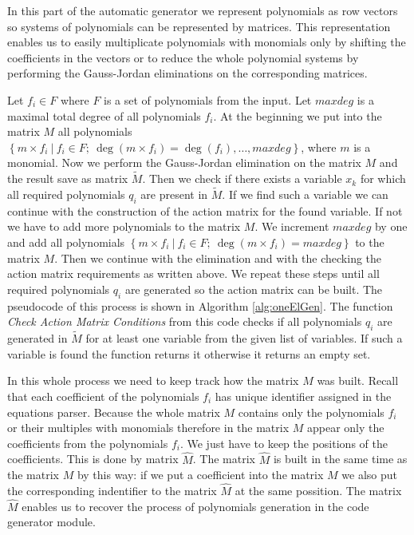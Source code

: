 In this part of the automatic generator we represent polynomials as row vectors so systems of polynomials can be represented by matrices. This representation enables us to easily multiplicate polynomials with monomials only by shifting the coefficients in the vectors or to reduce the whole polynomial systems by performing the Gauss-Jordan eliminations on the corresponding matrices.

Let $f_i \in F$ where $F$ is a set of polynomials from the input. Let $maxdeg$ is a maximal total degree of all polynomials $f_i$. At the beginning we put into the matrix $M$ all polynomials $\left\{m\times f_i\ |\ f_i \in F;\ \deg(m\times f_i) = \deg(f_i),\dots, maxdeg\right\}$, where $m$ is a monomial. Now we perform the Gauss-Jordan elimination on the matrix $M$ and the result save as matrix $\tilde{M}$. Then we check if there exists a variable $x_k$ for which all required polynomials $q_i$ are present in $\tilde{M}$. If we find such a variable we can continue with the construction of the action matrix for the found variable. If not we have to add more polynomials to the matrix $M$. We increment $maxdeg$ by one and add all polynomials $\left\{m\times f_i\ |\ f_i \in F;\ \deg(m\times f_i) = maxdeg\right\}$ to the matrix $M$. Then we continue with the elimination and with the checking the action matrix requirements as written above. We repeat these steps until all required polynomials $q_i$ are generated so the action matrix can be built. The pseudocode of this process is shown in Algorithm \ref{alg:oneElGen}. The function \textit{Check Action Matrix Conditions} from this code checks if all polynomials $q_i$ are generated in $\tilde{M}$ for at least one variable from the given list of variables. If such a variable is found the function returns it otherwise it returns an empty set.



In this whole process we need to keep track how the matrix $M$ was built. Recall that each coefficient of the polynomials $f_i$ has unique identifier assigned in the equations parser. Because the whole matrix $M$ contains only the polynomials $f_i$ or their multiples with monomials therefore in the matrix $M$ appear only the coefficients from the polynomials $f_i$. We just have to keep the positions of the coefficients. This is done by matrix $\hat{M}$. The matrix $\hat{M}$ is built in the same time as the matrix $M$ by this way: if we put a coefficient into the matrix $M$ we also put the corresponding indentifier to the matrix $\hat{M}$ at the same possition. The matrix $\hat{M}$ enables us to recover the process of polynomials generation in the code generator module.

